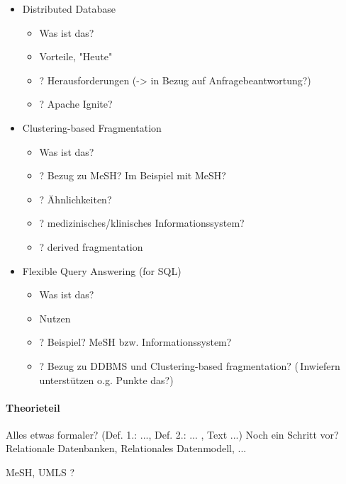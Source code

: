 \begin{itemize}
    \item Distributed Database
    \begin{itemize}
        \item Was ist das?
        \item Vorteile, "Heute"
        \item ? Herausforderungen (-> in Bezug auf Anfragebeantwortung?)
        \item ? Apache Ignite?
    \end{itemize}
    
    \item Clustering-based Fragmentation
    \begin{itemize}
        \item Was ist das?
        \item ? Bezug zu MeSH? Im Beispiel mit MeSH?
        \item ? Ähnlichkeiten?
        \item ? medizinisches/klinisches Informationssystem?
        \item ? derived fragmentation
    \end{itemize}
    
    \item Flexible Query Answering (for SQL)
    \begin{itemize}
        \item Was ist das?
        \item Nutzen
        \item ? Beispiel? MeSH bzw. Informationssystem?
        \item ? Bezug zu DDBMS und Clustering-based fragmentation?\newline
                (\textrightarrow\,Inwiefern unterstützen o.g. Punkte das?)
    \end{itemize}
\end{itemize}



\paragraph{Theorieteil}

Alles etwas formaler? (Def. 1.: ..., Def. 2.: ... , Text ...)
Noch ein Schritt vor? Relationale Datenbanken, Relationales Datenmodell, ...

MeSH, UMLS ?

